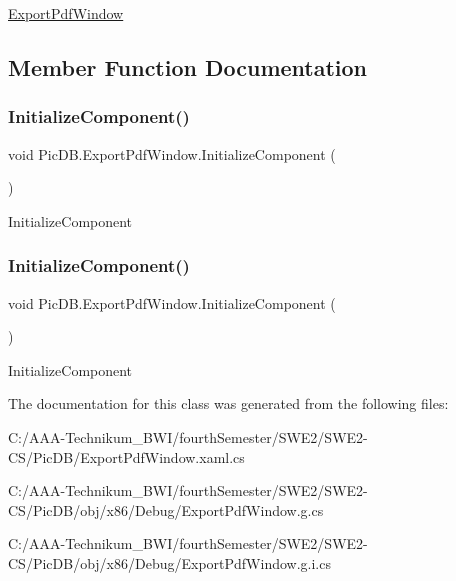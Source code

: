 \mbox{\hyperlink{class_pic_d_b_1_1_export_pdf_window}{Export\+Pdf\+Window}} 

\subsection{Member Function Documentation}
\mbox{\label{class_pic_d_b_1_1_export_pdf_window_aad2857cbab242278820d73fb64af3fb6}} 
\subsubsection{\texorpdfstring{Initialize\+Component()}{InitializeComponent()}\hspace{0.1cm}{\footnotesize\ttfamily [1/2]}}
{\footnotesize\ttfamily void Pic\+D\+B.\+Export\+Pdf\+Window.\+Initialize\+Component (\begin{DoxyParamCaption}{ }\end{DoxyParamCaption})}



Initialize\+Component 

\mbox{\label{class_pic_d_b_1_1_export_pdf_window_aad2857cbab242278820d73fb64af3fb6}} 
\subsubsection{\texorpdfstring{Initialize\+Component()}{InitializeComponent()}\hspace{0.1cm}{\footnotesize\ttfamily [2/2]}}
{\footnotesize\ttfamily void Pic\+D\+B.\+Export\+Pdf\+Window.\+Initialize\+Component (\begin{DoxyParamCaption}{ }\end{DoxyParamCaption})}



Initialize\+Component 



The documentation for this class was generated from the following files\+:\begin{DoxyCompactItemize}
\item 
C\+:/\+A\+A\+A-\/\+Technikum\+\_\+\+B\+W\+I/fourth\+Semester/\+S\+W\+E2/\+S\+W\+E2-\/\+C\+S/\+Pic\+D\+B/Export\+Pdf\+Window.\+xaml.\+cs\item 
C\+:/\+A\+A\+A-\/\+Technikum\+\_\+\+B\+W\+I/fourth\+Semester/\+S\+W\+E2/\+S\+W\+E2-\/\+C\+S/\+Pic\+D\+B/obj/x86/\+Debug/Export\+Pdf\+Window.\+g.\+cs\item 
C\+:/\+A\+A\+A-\/\+Technikum\+\_\+\+B\+W\+I/fourth\+Semester/\+S\+W\+E2/\+S\+W\+E2-\/\+C\+S/\+Pic\+D\+B/obj/x86/\+Debug/Export\+Pdf\+Window.\+g.\+i.\+cs\end{DoxyCompactItemize}
